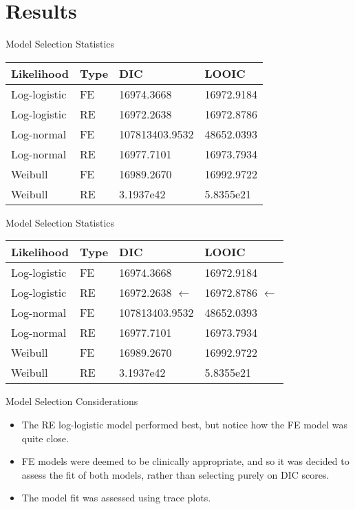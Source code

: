 \documentclass{beamer}
\begin{document}
\section{Results}

\begin{frame}{Model Selection Statistics}
\begin{table}
    \centering
    \begin{tabular}{llll}
    \hline
    Likelihood   & Type & DIC         & LOOIC      \\ \hline
    Log-logistic & FE  & 16974.3668  & 16972.9184 \\
    Log-logistic & RE & 16972.2638  & 16972.8786 \\
    Log-normal   & FE  & 107813403.9532  & 48652.0393 \\
    Log-normal   & RE & 16977.7101  & 16973.7934 \\
    Weibull      & FE  & 16989.2670 & 16992.9722 \\
    Weibull      & RE & 3.1937e42 & 5.8355e21 \\ \hline
    \end{tabular}
\end{table}
\end{frame}

\begin{frame}{Model Selection Statistics}
\begin{table}
    \centering
    \begin{tabular}{llll}
    \hline
    Likelihood   & Type & DIC         & LOOIC      \\ \hline
    Log-logistic & FE  & 16974.3668  & 16972.9184 \\
    Log-logistic & RE & 16972.2638  $\leftarrow$ & 16972.8786 $\leftarrow$ \\
    Log-normal   & FE  & 107813403.9532  & 48652.0393 \\
    Log-normal   & RE & 16977.7101  & 16973.7934 \\
    Weibull      & FE  & 16989.2670 & 16992.9722 \\
    Weibull      & RE & 3.1937e42 & 5.8355e21 \\ \hline
    \end{tabular}
\end{table}
\end{frame}

\begin{frame}{Model Selection Considerations}
    \begin{itemize}
        \item The RE log-logistic model performed best, but notice how the FE model was quite close.
        \pause
        \item FE models were deemed to be clinically appropriate, and so it was decided to assess the fit of both models, rather than selecting purely on DIC scores.
        \pause
        \item The model fit was assessed using trace plots. 
    \end{itemize}
\end{frame}
\end{document}
